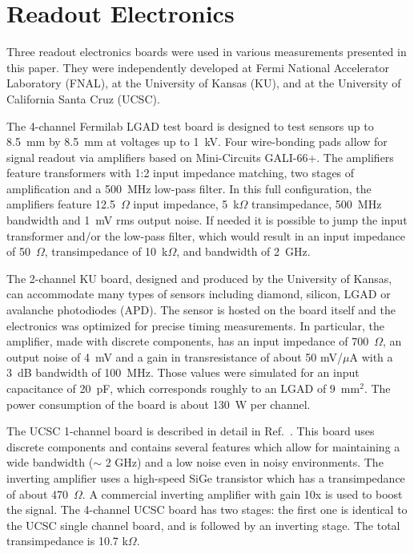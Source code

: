 \documentclass[preprint,1p]{elsarticle}
\begin{document}
\section{Readout Electronics}
\label{sec:boards}

Three readout electronics boards were used in various measurements presented in this paper.
They were independently developed at Fermi National Accelerator Laboratory (FNAL),
at the University of Kansas (KU), and at the University of California Santa Cruz (UCSC).

The 4-channel Fermilab LGAD test board is designed to test sensors up to 8.5~mm
by 8.5~mm at voltages up to 1~kV. Four wire-bonding pads allow for signal
readout via amplifiers based on Mini-Circuits GALI-66+. The amplifiers feature 
transformers with 1:2 input impedance matching, two stages of amplification and 
a 500~MHz low-pass filter. In this full configuration, the amplifiers feature
12.5~$\Omega$ input impedance, 5~k$\Omega$ transimpedance, 500~MHz bandwidth and
1~mV rms output noise. If needed it is possible to jump the input transformer 
and/or the low-pass filter, which would result in an input impedance of 50~$\Omega$,
transimpedance of 10~k$\Omega$, and bandwidth of 2~GHz.

The 2-channel KU board, designed and produced by the University of Kansas, can
accommodate many types of sensors including diamond, silicon, LGAD or avalanche photodiodes (APD). 
The sensor is hosted on the board itself and the electronics was optimized for precise 
timing measurements. In particular, the amplifier, made with discrete components, 
has an input impedance of 700~$\Omega$, an output noise of 4~mV and a gain in 
transresistance of about 50 mV/$\mu$A with a 3~dB bandwidth of 100~MHz. 
Those values were simulated for an input capacitance of 20~pF, 
which corresponds roughly to an LGAD of $9$~$\mathrm{mm}^{2}$. The power
consumption of the board is about 130~W per channel. 

The UCSC 1-channel board is described in detail in
Ref.~\cite{Cartiglia201783}. This board uses discrete components and contains
several features which allow for maintaining a wide bandwidth ($\sim$ 2 GHz) and a
low noise even in noisy environments. The inverting amplifier uses a high-speed
SiGe transistor which has a transimpedance of about 470~$\Omega$. A commercial
inverting amplifier with gain 10x is used to boost the signal. The 4-channel
UCSC board has two stages: the first one is identical to the UCSC single channel
board, and is followed by an inverting stage. The total transimpedance is 10.7
k$\Omega$.
\end{document}
